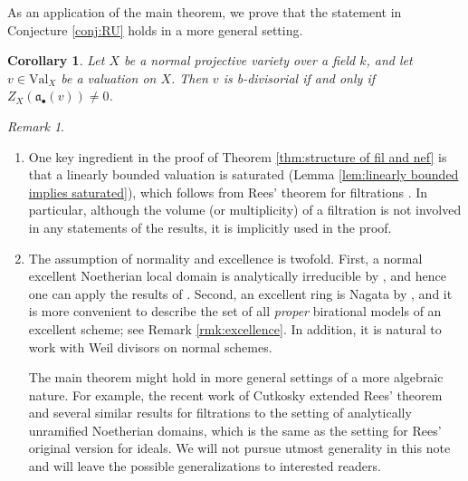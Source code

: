 \documentclass[11pt, leqno]{amsart}%
\theoremstyle{plain}
\newtheorem{corollary}[theorem]{Corollary}
\theoremstyle{definition}
\theoremstyle{remark}
\newtheorem{remark}[theorem]{Remark}
\newcommand{\fa}{\mathfrak{a}}
\newcommand{\Val}{\mathrm{Val}}
\begin{document}
As an application of the main theorem, we prove that the statement in Conjecture \ref{conj:RU} holds in a more general setting.

\begin{corollary}\label{cor:b-div filtration}
    Let $X$ be a normal projective variety over a field $k$, and let  $v\in \Val_X$ be a valuation on $X$. Then $v$ is b-divisorial if and only if $Z_X(\fa_\bullet(v))\ne 0$.
\end{corollary}




\medskip 

\begin{remark}
\begin{enumerate}
    \item One key ingredient in the proof of Theorem \ref{thm:structure of fil and nef} is that a linearly bounded valuation is saturated (Lemma \ref{lem:linearly bounded implies saturated}), which follows from Rees' theorem for filtrations \cite[Theorem 1.4]{BLQ-convexity}.
    In particular, although the volume (or multiplicity) of a filtration is not involved in any statements of the results, it is implicitly used in the proof. 

    
    \item The assumption of normality and excellence is twofold. 
    First, a normal excellent Noetherian local domain is analytically irreducible by \cite[\href{https://stacks.math.columbia.edu/tag/0C23}{Lemma 0C23}]{stacks-project}, and hence one can apply the results of \cite{BLQ-convexity}. 
    Second, an excellent ring is Nagata by \cite[\href{https://stacks.math.columbia.edu/tag/07QV}{Lemma 07QV}]{stacks-project}, and it is more convenient to describe the set of all \emph{proper} birational models of an excellent scheme; see Remark \ref{rmk:excellence}.
    In addition, it is natural to work with Weil divisors on normal schemes.
    
    The main theorem might hold in more general settings of a more algebraic nature. For example, the recent work of Cutkosky \cite{Cut-unramified} extended Rees' theorem and several similar results for filtrations to the setting of analytically unramified Noetherian domains, which is the same as the setting for Rees' original version \cite{Rees-Rees} for ideals.
    We will not pursue utmost generality in this note and will leave the possible generalizations to interested readers.


\end{enumerate}
\end{remark}
\end{document}
